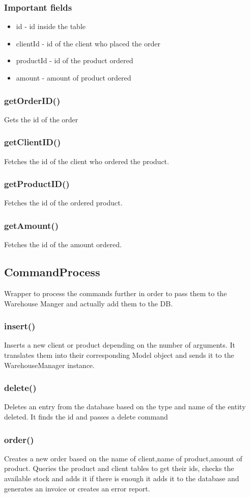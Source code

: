 \documentclass[10pt,a4paper]{article}
\begin{document}
\subsubsection{Important fields}
\begin{itemize}
\item id - id inside the table
\item clientId - id of the client who placed the order
\item productId - id of the product ordered
\item amount - amount of product ordered
\end{itemize}
\subsubsection{getOrderID()}
Gets the id of the order
\subsubsection{getClientID()}
Fetches the id of the client who ordered the product.
\subsubsection{getProductID()}
Fetches the id of the ordered product.
\subsubsection{getAmount()}
Fetches the id of the amount ordered.

\subsection{CommandProcess}
Wrapper to process the commands further in order to pass them to the Warehouse Manger and actually add them to the DB.
\subsubsection{insert()}
Inserts a new client or product depending on the number of arguments. It translates them into their corresponding Model object and sends it to the WarehouseManager instance.
\subsubsection{delete()}
Deletes an entry from the database based on the type and name of the entity deleted. It finds the id and passes a delete command
\subsubsection{order()}
Creates a new order based on the name of client,name of product,amount of product. Queries the product and client tables to get their ids, checks the available stock and adds it if there is enough it adds it to the database and generates an invoice or creates an error report.
\end{document}
